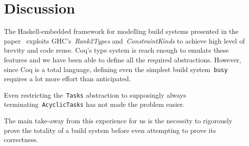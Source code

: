 \documentclass[sigplan,review]{acmart}\settopmatter{printfolios=true,printccs=false,printacmref=false}
\newcommand{\hs}{\texttt}
\begin{document}
\vspace{-3mm}
\section{Discussion}\label{sec-discussion}
\vspace{-1mm}

The Haskell-embedded framework for modelling build systems presented in the
paper~\cite{Mokhov2018icfp} exploits GHC's~\emph{Rank2Types}
and~\emph{ConstraintKinds} to achieve high level of brevity and code reuse.
Coq's type system is reach enough to emulate these features and we have been able
to define all the required abstractions. However, since Coq is a total language,
defining even the simplest build system~\hs{busy} requires a lot more
effort than anticipated.

Even restricting the~\hs{Tasks} abstraction to
supposingly always terminating~\hs{AcyclicTasks} has not made the problem easier.

The main take-away from this experience for us is the necessity to rigorously
prove the totality of a build system before even attempting to prove its correctness.







\end{document}
